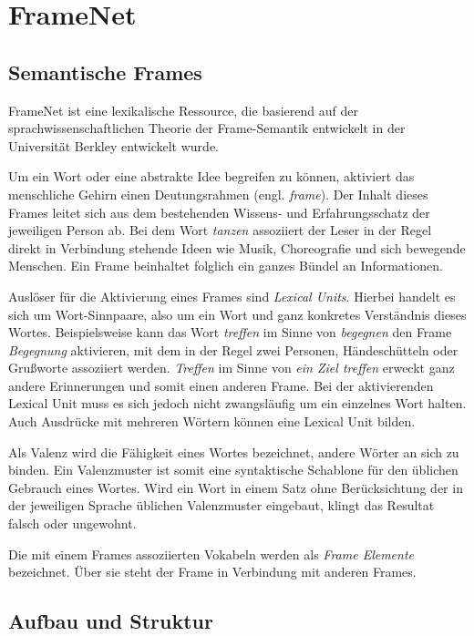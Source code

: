 \section{FrameNet}

\subsection{Semantische Frames}

FrameNet ist eine lexikalische Ressource, die basierend auf der sprachwissenschaftlichen Theorie der Frame-Semantik entwickelt in der Universität Berkley entwickelt wurde. 
\par
Um ein Wort oder eine abstrakte Idee begreifen zu können, aktiviert das menschliche Gehirn einen Deutungsrahmen (engl. \textit{frame}). Der Inhalt dieses Frames leitet sich aus dem bestehenden Wissens- und Erfahrungsschatz der jeweiligen Person ab. Bei dem Wort \textit{tanzen} assoziiert der Leser in der Regel direkt in Verbindung stehende Ideen wie Musik, Choreografie und sich bewegende Menschen. Ein Frame beinhaltet folglich ein ganzes Bündel an Informationen.
\par
Auslöser für die Aktivierung eines Frames sind \textit{Lexical Units}. Hierbei handelt es sich um Wort-Sinnpaare, also um ein Wort und ganz konkretes Verständnis dieses Wortes. Beispielsweise kann das Wort \textit{treffen} im Sinne von \textit{begegnen} den Frame \textit{Begegnung} aktivieren, mit dem in der Regel zwei Personen, Händeschütteln oder Grußworte assoziiert werden. \textit{Treffen} im Sinne von \textit{ein Ziel treffen} erweckt ganz andere Erinnerungen und somit einen anderen Frame. Bei der aktivierenden Lexical Unit muss es sich jedoch nicht zwangsläufig um ein einzelnes Wort halten. Auch Ausdrücke mit mehreren Wörtern können eine Lexical Unit bilden.
\par
Als Valenz wird die Fähigkeit eines Wortes bezeichnet, andere Wörter an sich zu binden. Ein Valenzmuster ist somit eine syntaktische Schablone für den üblichen Gebrauch eines Wortes. Wird ein Wort in einem Satz ohne Berücksichtung der in der jeweiligen Sprache üblichen Valenzmuster eingebaut, klingt das Resultat falsch oder ungewohnt.
\par
Die mit einem Frames assoziierten Vokabeln werden als \textit{Frame Elemente} bezeichnet. Über sie steht der Frame in Verbindung mit anderen Frames. 

\subsection{Aufbau und Struktur}

